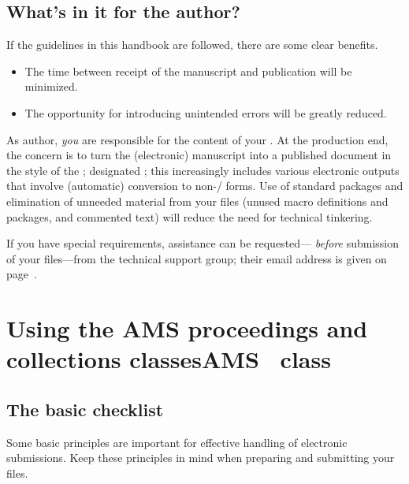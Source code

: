 \fi %

\makeatletter
\if@openany
\else \@openrighttrue
\fi
\makeatother


\section*{What's in it for the author?}

If the guidelines in this handbook are followed, there are some
clear benefits.
\begin{itemize}
\item The time between receipt of the manuscript and publication
  will be minimized.
\item The opportunity for introducing unintended errors will be
  greatly reduced.
\end{itemize}

As author, \emph{you} are responsible for the content of your
.  At the production end, the concern
is to turn the (electronic) manuscript into a published document in
the style of the
\ifmemoirs \Memos;
\else
 designated ;
\fi
this
\ifmemoirs
\else increasingly
\fi
includes various electronic outputs that
%
involve (automatic) conversion to non-\latex/ forms.  Use of standard
packages and elimination of unneeded material from your files (unused
macro definitions and packages, and commented text) will reduce the
need for technical tinkering.

If you have special requirements, assistance can be requested---%
\emph{before} submission of your files---from the technical support
group; their email address is given on page~\pageref{ch:resandhelp}.



\chapter{Using the
 \protect{}%
 {AMS proceedings and collections classes}{AMS \Memos\ class}}

\ifmemoirs
{}
\fi

\section{The basic checklist}\label{sec:check}
\noindent Some basic principles are important for effective handling of
 electronic submissions. Keep these principles in mind when preparing and
 submitting your files.

